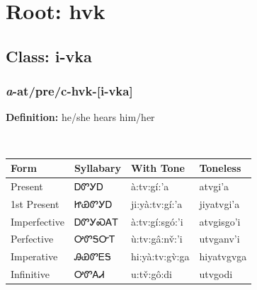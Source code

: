 \needspace{4in}
\section*{Root: hvk}
\nopagebreak
{}
\needspace{3in}
\subsection*{Class: i-vka}
\nopagebreak
\needspace{2in}
\subsubsection*{\textit{a}{-}at/pre/c{-}\textbf{hvk}{-}[i-vka]}
\nopagebreak
\textbf{Definition: } he/she hears him/her
\\[0.5em]
\begin{tabularx}{\textwidth}{l X X X}%
\toprule%
\textbf{Form}&\textbf{Syllabary}&\textbf{With Tone}&\textbf{Toneless}\\%
\midrule%
Present&ᎠᏛᎩᎠ&à:tv:gí:’a&atvgi’a\\%
1st Present&ᏥᏯᏛᎩᎠ&ji:yà:tv:gí:’a&jiyatvgi’a\\%
Imperfective&ᎠᏛᎩᏍᎪᎢ&à:tv:gí:sgó:’i&atvgisgo’i\\%
Perfective&ᎤᏛᎦᏅᎢ&ù:tv:gâ:nv̌:’i&utvganv’i\\%
Imperative&ᎯᏯᏛᎬᎦ&hi:yà:tv:gv̀:ga&hiyatvgvga\\%
Infinitive&ᎤᏛᎪᏗ&u:tv̌:gô:di&utvgodi\\%
\bottomrule%
\end{tabularx}
\\[1em]